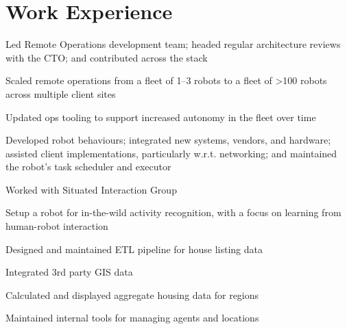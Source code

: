 \documentclass[]{deedy-resume}
\begin{document}
\begin{minipage}[t]{0.66\textwidth}


\section{Work Experience}
\vspace{0.3cm}
\begin{tightemize}
\item Led Remote Operations development team; headed regular architecture reviews with the CTO; and contributed across the stack
\item Scaled remote operations from a fleet of 1--3 robots to a fleet of >100 robots across multiple client sites
\item Updated ops tooling to support increased autonomy in the fleet over time
\item Developed robot behaviours; integrated new systems, vendors, and hardware; assisted client implementations, particularly w.r.t. networking; and maintained the robot's task scheduler and executor
\end{tightemize}
\sectionsep

\begin{tightemize}
\item Worked with Situated Interaction Group
\item Setup a robot for in-the-wild activity recognition, with a focus on learning from human-robot interaction
\end{tightemize}
\sectionsep

\begin{tightemize}
\item Designed and maintained ETL pipeline for house listing data
\item Integrated 3rd party GIS data
\item Calculated and displayed aggregate housing data for regions
\item Maintained internal tools for managing agents and locations
\end{tightemize}
\sectionsep


\end{minipage}
\end{document}
